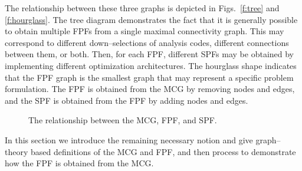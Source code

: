 The relationship between these three graphs is depicted in Figs.~\ref{f:tree} and \ref{f:hourglass}. The tree diagram demonstrates the fact that it is generally possible to obtain multiple FPFs from a single maximal connectivity graph. This  may correspond to different down--selections of analysis codes, different connections between them, or both. Then, for each FPF, different SPFs may be obtained by implementing different optimization architectures. The hourglass shape indicates that the FPF graph is the smallest graph that may represent a specific problem formulation. The FPF is obtained from the MCG by removing nodes and edges, and the SPF is obtained from the FPF by adding nodes and edges.
\begin{figure}[htb!]
	\centering
\caption{The relationship between the MCG, FPF, and SPF.}
\end{figure}

In this section we introduce the remaining necessary notion and give graph--theory based definitions of the MCG and FPF, and then process to demonstrate how the FPF is obtained from the MCG.

